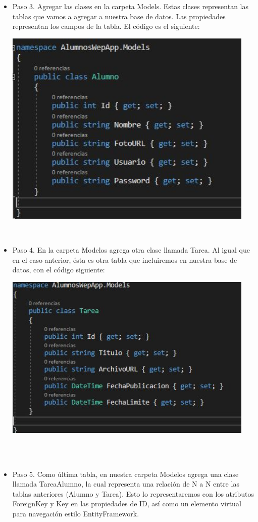 \begin{flushleft}
\begin{itemize}
\textbf{ }\\
\item Paso 3. Agregar las clases en la carpeta Models. Estas clases representan las tablas que vamos a agregar a nuestra base de datos. Las propiedades representan los campos de la tabla. El código es el siguiente:
\begin{center}
	\includegraphics[width=12cm]{./Imagenes/paso3} 
	\end{center}
\textbf{ }\\
\item Paso 4. En la carpeta Modelos agrega otra clase llamada Tarea. Al igual que en el caso anterior, ésta es
otra tabla que incluiremos en nuestra base de datos, con el código siguiente: 
\begin{center}
	\includegraphics[width=12cm]{./Imagenes/paso4} 
	\end{center}

\textbf{ }\\
\textbf{ }\\
\item Paso 5. Como última tabla, en nuestra carpeta Modelos agrega una clase llamada TareaAlumno, la cual
representa una relación de N a N entre las tablas anteriores (Alumno y Tarea). Esto lo representaremos
con los atributos ForeignKey y Key en las propiedades de ID, así como un elemento virtual para
navegación estilo EntityFramework.


\end{itemize}
\end{flushleft}
